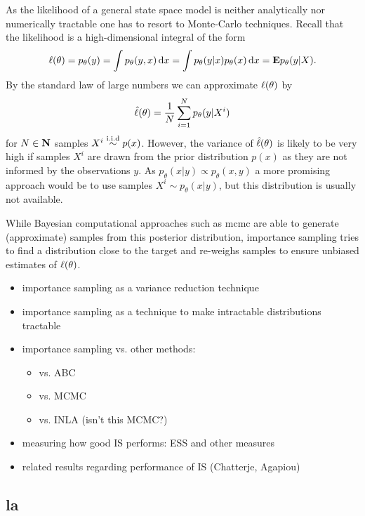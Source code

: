 As the likelihood of a general state space model is neither analytically nor numerically tractable one has to resort to Monte-Carlo techniques.
Recall that the likelihood is a high-dimensional integral of the form
\begin{align*}
    \ell(\theta) = p_\theta(y) = \int p_\theta(y,x) \,\mathrm d x = \int p_\theta(y|x) p_\theta(x) \,\mathrm d x = \mathbf E p_\theta(y|X).
\end{align*}
By the standard law of large numbers we can approximate $\ell(\theta)$ by
\begin{align*}
    \hat{\ell}(\theta) = \frac 1 N \sum_{i=1}^N p_\theta(y|X^i)
\end{align*}
for $N\in\mathbf N$ samples $X^i \stackrel{\text{i.i.d}}{\sim} p(x)$.
However, the variance of $\hat{\ell}(\theta)$ is likely to be very high if samples $X^i$ are drawn from the prior distribution $p(x)$ as they are not informed by the observations $y$.
As $p_\theta(x|y) \propto p_\theta(x,y)$ a more promising approach would be to use samples $X^i \sim p_\theta(x|y)$, but this distribution is usually not available.

While Bayesian computational approaches such as \gls{mcmc}\cite{Brooks2011Handbook} are able to generate (approximate) samples from this posterior distribution, importance sampling tries to find a distribution close to the target and re-weighs samples to ensure unbiased estimates of $\ell(\theta)$.

\begin{itemize}
    \item importance sampling as a variance reduction technique
    \item importance sampling as a technique to make intractable distributions tractable
    \item importance sampling vs. other methods:
          \begin{itemize}
              \item vs. ABC
              \item vs. MCMC
              \item vs. INLA (isn't this MCMC?)
          \end{itemize}
    \item measuring how good IS performs: ESS and other measures
    \item related results regarding performance of IS (Chatterje, Agapiou)
\end{itemize}

\subsection{\texorpdfstring{\Acrfull{la}}{Laplace approximation}}

